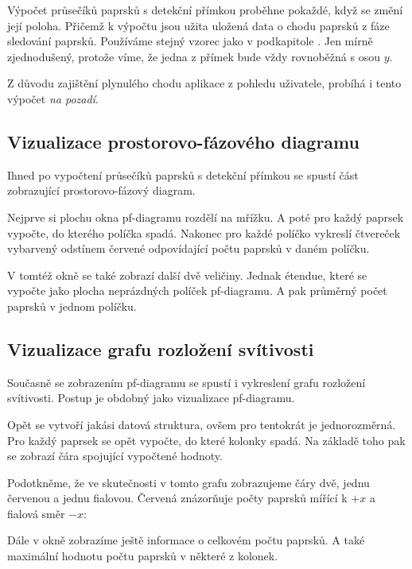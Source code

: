 Výpočet průsečíků paprsků s detekční přímkou proběhne pokaždé, když se změní její poloha. Přičemž k výpočtu jsou užita uložená data o chodu paprsků z fáze sledování paprsků. Používáme stejný vzorec jako v podkapitole . Jen mírně zjednodušený, protože víme, že jedna z přímek bude vždy rovnoběžná s osou $y$.

Z důvodu zajištění plynulého chodu aplikace z pohledu uživatele, probíhá i tento výpočet \emph{na pozadí}.


\subsection{Vizualizace prostorovo-fázového diagramu}

Ihned po vypočtení průsečíků paprsků s detekční přímkou se spustí část zobrazující prostorovo-fázový diagram.

Nejprve si plochu okna pf-diagramu rozdělí na mřížku. A poté pro každý paprsek vypočte, do kterého políčka spadá. Nakonec pro každé políčko vykreslí čtvereček vybarvený odstínem červené odpovídající počtu paprsků v daném políčku.

V tomtéž okně se také zobrazí další dvě veličiny. Jednak étendue, které se vypočte jako plocha neprázdných políček pf-diagramu. A pak průměrný počet paprsků v jednom políčku.


\subsection{Vizualizace grafu rozložení svítivosti}

Současně se zobrazením pf-diagramu se spustí i vykreslení grafu rozložení svítivosti. Postup je obdobný jako vizualizace pf-diagramu.

Opět se vytvoří jakási datová struktura, ovšem pro tentokrát je jednorozměrná. Pro každý paprsek se opět vypočte, do které kolonky spadá. Na základě toho pak se zobrazí čára spojující vypočtené hodnoty.

Podotkněme, že ve skutečnosti v tomto grafu zobrazujeme čáry dvě, jednu červenou a jednu fialovou. Červená znázorňuje počty paprsků mířící k $+x$ a fialová směr $-x$:

Dále v okně zobrazíme ještě informace o celkovém počtu paprsků. A také maximální hodnotu počtu paprsků v některé z kolonek.


